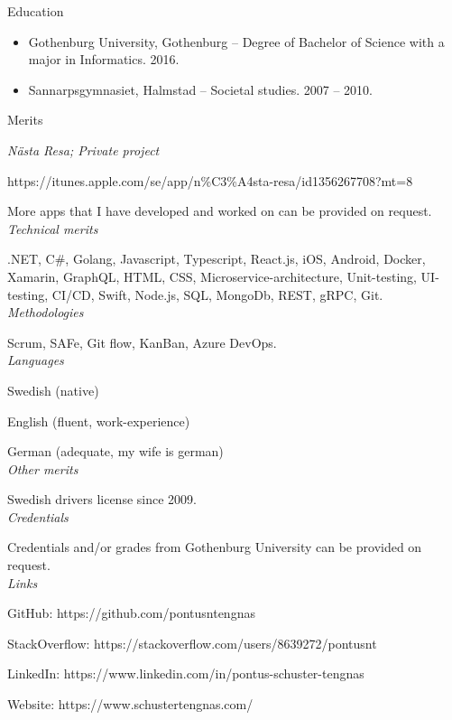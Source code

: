 \vspace{12px}

{\itshape\Large\begin{center}
Education
\end{center}}

\vspace{12px}

\begin{itemize}
  \item Gothenburg University, Gothenburg – Degree of Bachelor of Science with a major in Informatics. 2016.

  \item Sannarpsgymnasiet, Halmstad – Societal studies. 2007 – 2010.
\end{itemize}

\newpage

{\itshape\Large\begin{center}
Merits
\end{center}}

\vspace{12px}

{\itshape Nästa Resa; Private project}

https://itunes.apple.com/se/app/n\%C3\%A4sta-resa/id1356267708?mt=8

More apps that I have developed and worked on can be provided on request.\\

{\itshape Technical merits}

.NET, C\#, Golang, Javascript, Typescript, React.js, iOS, Android, Docker, Xamarin, GraphQL, HTML,
CSS, Microservice-architecture, Unit-testing, UI-testing, CI/CD, Swift, Node.js, SQL, MongoDb, REST, gRPC, Git.\\

{\itshape Methodologies}

Scrum, SAFe, Git flow, KanBan, Azure DevOps.\\

{\itshape Languages}

Swedish (native)

English (fluent, work-experience)

German (adequate, my wife is german)\\

{\itshape Other merits}

Swedish drivers license since 2009.\\

{\itshape Credentials}

Credentials and/or grades from Gothenburg University can be provided on request.\\

{\itshape Links}

GitHub: https://github.com/pontusntengnas

StackOverflow: https://stackoverflow.com/users/8639272/pontusnt

LinkedIn: https://www.linkedin.com/in/pontus-schuster-tengnas

Website: https://www.schustertengnas.com/

